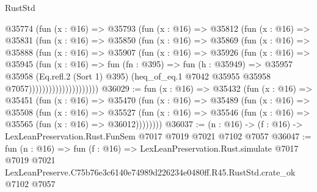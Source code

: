 \begin{lexlean}{RustStd}
\begin{coremodule}
                      @35774
                        (fun (x : @16) =>
                        @35793
                          (fun (x : @16) =>
                          @35812
                            (fun (x : @16) =>
                            @35831
                              (fun (x : @16) =>
                              @35850
                                (fun (x : @16) =>
                                @35869
                                  (fun (x : @16) =>
                                  @35888
                                    (fun (x : @16) =>
                                    @35907
                                      (fun (x : @16) =>
                                      @35926
                                        (fun (x : @16) =>
                                        @35945
                                          (fun (x : @16) =>
                                          fun (fn : @395) =>
                                          fun (h : @35949) =>
                                          @35957
                                            @35958
                                            (Eq.refl.{2} (Sort 1) @395)
                                            (heq_of_eq.{1}
                                              @7042
                                              @35955
                                              @35958
                                              @7057)))))))))))))))))))))
@36029 := fun (x : @16) =>
  @35432
    (fun (x : @16) =>
    @35451
      (fun (x : @16) =>
      @35470
        (fun (x : @16) =>
        @35489
          (fun (x : @16) =>
          @35508
            (fun (x : @16) =>
            @35527
              (fun (x : @16) => @35546 (fun (x : @16) => @35565 (fun (x : @16) => @36012))))))))
@36037 := (n : @16) -> (f : @16) -> LexLeanPreservation.Rust.FunSem @7017 @7019 @7021 @7102 @7057
@36047 := fun (n : @16) =>
  fun (f : @16) =>
  LexLeanPreservation.Rust.simulate
    @7017
    @7019
    @7021
    LexLeanPreserve.C75b76e3c6140e74989d226234e0480ff.R45.RustStd.crate_ok
    @7102
    @7057
\end{coremodule}
\end{lexlean}
